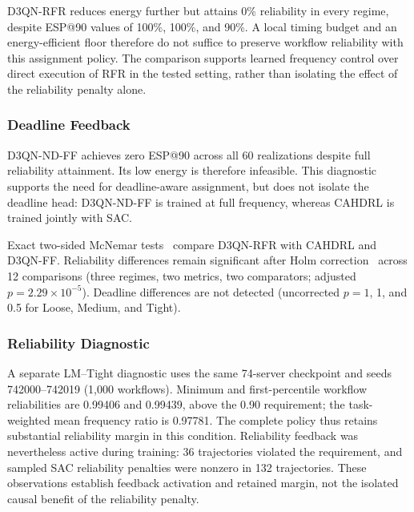 \documentclass[journal]{IEEEtran}
\begin{document}
D3QN-RFR reduces energy further but attains 0\% reliability in every regime, despite ESP@90 values of 100\%, 100\%, and 90\%. A local timing budget and an energy-efficient floor therefore do not suffice to preserve workflow reliability with this assignment policy. The comparison supports learned frequency control over direct execution of RFR in the tested setting, rather than isolating the effect of the reliability penalty alone.

\subsubsection{Deadline Feedback}
D3QN-ND-FF achieves zero ESP@90 across all 60 realizations despite full reliability attainment. Its low energy is therefore infeasible. This diagnostic supports the need for deadline-aware assignment, but does not isolate the deadline head: D3QN-ND-FF is trained at full frequency, whereas CAHDRL is trained jointly with SAC.

Exact two-sided McNemar tests~\cite{mcnemar1947} compare D3QN-RFR with CAHDRL and D3QN-FF. Reliability differences remain significant after Holm correction~\cite{holm1979} across 12 comparisons (three regimes, two metrics, two comparators; adjusted $p=2.29\times10^{-5}$). Deadline differences are not detected (uncorrected $p=1$, 1, and 0.5 for Loose, Medium, and Tight).

\subsubsection{Reliability Diagnostic}
A separate LM--Tight diagnostic uses the same 74-server checkpoint and seeds 742000--742019 (1,000 workflows). Minimum and first-percentile workflow reliabilities are 0.99406 and 0.99439, above the 0.90 requirement; the task-weighted mean frequency ratio is 0.97781. The complete policy thus retains substantial reliability margin in this condition. Reliability feedback was nevertheless active during training: 36 trajectories violated the requirement, and sampled SAC reliability penalties were nonzero in 132 trajectories. These observations establish feedback activation and retained margin, not the isolated causal benefit of the reliability penalty.
\end{document}
